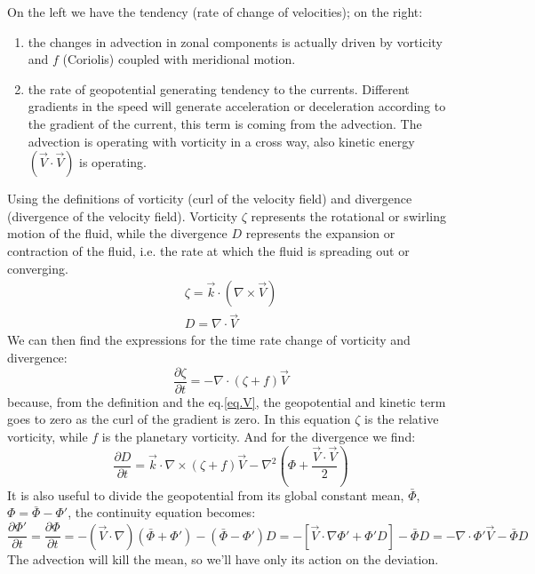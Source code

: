 On the left we have the tendency (rate of change of velocities); on the right: 
\begin{enumerate}
    \item the changes in advection in zonal components is actually driven by vorticity and $f$ (Coriolis) coupled with meridional motion.
    \item the rate of geopotential generating tendency to the currents. Different gradients in the speed will generate acceleration or deceleration according to the gradient of the current, this term is coming from the advection. The advection is operating with vorticity in a cross way, also kinetic energy $(\vec{V}\cdot\vec{V})$ is operating.
\end{enumerate}


Using the definitions of vorticity (curl of the velocity field) and divergence (divergence of the velocity field). Vorticity $\zeta$ represents the rotational or swirling motion of the fluid, while the divergence $D$ represents the expansion or contraction of the fluid, i.e. the rate at which the fluid is spreading out or converging.
\begin{align}\label{eq.defsvortdiv}
    \zeta=\vec{k}\cdot(\nabla\times \vec{V})\\
    D=\nabla\cdot\vec{V}
\end{align}
We can then find the expressions for the time rate change of vorticity and divergence:
\begin{equation}\label{eq.for vorticity time change}
    \frac{\partial\zeta}{\partial t}=-\nabla\cdot(\zeta +f)\vec{V}
\end{equation}
because, from the definition and the eq.\ref{eq.V}, the geopotential and kinetic term goes to zero as the curl of the gradient is zero. In this equation $\zeta$ is the relative vorticity, while $f$ is the planetary vorticity. And for the divergence we find:
\begin{equation}\label{eq.for divergence time change}
    \frac{\partial D}{\partial t}=\vec{k}\cdot\nabla\times(\zeta+f)\vec{V}-\nabla^2\left(\Phi+\frac{\vec{V}\cdot\vec{V}}{2}\right)
\end{equation}
It is also useful to divide the geopotential from its global constant mean, $\bar{\Phi}$, $\Phi=\bar{\Phi}-\Phi'$, the continuity equation becomes:
$$\frac{\partial\Phi'}{\partial t}=\frac{\partial\Phi}{\partial t}=-(\vec{V}\cdot\nabla)(\bar{\Phi}+\Phi')-(\bar{\Phi}-\Phi')D=-[\vec{V}\cdot\nabla\Phi'+\Phi'D]-\bar{\Phi}D=-\nabla\cdot\Phi'\vec{V}-\bar{\Phi}D$$
The advection will kill the mean, so we'll have only its action on the deviation. 

